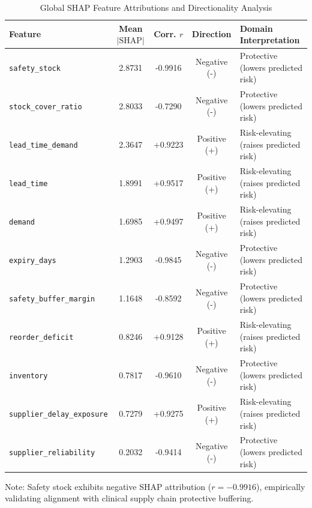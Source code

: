 \begin{table}[htbp]
\centering
\caption{Global SHAP Feature Attributions and Directionality Analysis}
\label{tab:shap_features}
\begin{tabular}{lcccl}
\toprule
\textbf{Feature} & \textbf{Mean $|\text{SHAP}|$} & \textbf{Corr. $r$} & \textbf{Direction} & \textbf{Domain Interpretation} \\
\midrule
\texttt{safety\_stock} & 2.8731 & -0.9916 & Negative (-) & Protective (lowers predicted risk) \\
\texttt{stock\_cover\_ratio} & 2.8033 & -0.7290 & Negative (-) & Protective (lowers predicted risk) \\
\texttt{lead\_time\_demand} & 2.3647 & +0.9223 & Positive (+) & Risk-elevating (raises predicted risk) \\
\texttt{lead\_time} & 1.8991 & +0.9517 & Positive (+) & Risk-elevating (raises predicted risk) \\
\texttt{demand} & 1.6985 & +0.9497 & Positive (+) & Risk-elevating (raises predicted risk) \\
\texttt{expiry\_days} & 1.2903 & -0.9845 & Negative (-) & Protective (lowers predicted risk) \\
\texttt{safety\_buffer\_margin} & 1.1648 & -0.8592 & Negative (-) & Protective (lowers predicted risk) \\
\texttt{reorder\_deficit} & 0.8246 & +0.9128 & Positive (+) & Risk-elevating (raises predicted risk) \\
\texttt{inventory} & 0.7817 & -0.9610 & Negative (-) & Protective (lowers predicted risk) \\
\texttt{supplier\_delay\_exposure} & 0.7279 & +0.9275 & Positive (+) & Risk-elevating (raises predicted risk) \\
\texttt{supplier\_reliability} & 0.2032 & -0.9414 & Negative (-) & Protective (lowers predicted risk) \\
\bottomrule
\end{tabular}
\begin{flushleft}
\small Note: Safety stock exhibits negative SHAP attribution ($r = -0.9916$), empirically validating alignment with clinical supply chain protective buffering.
\end{flushleft}
\end{table}
